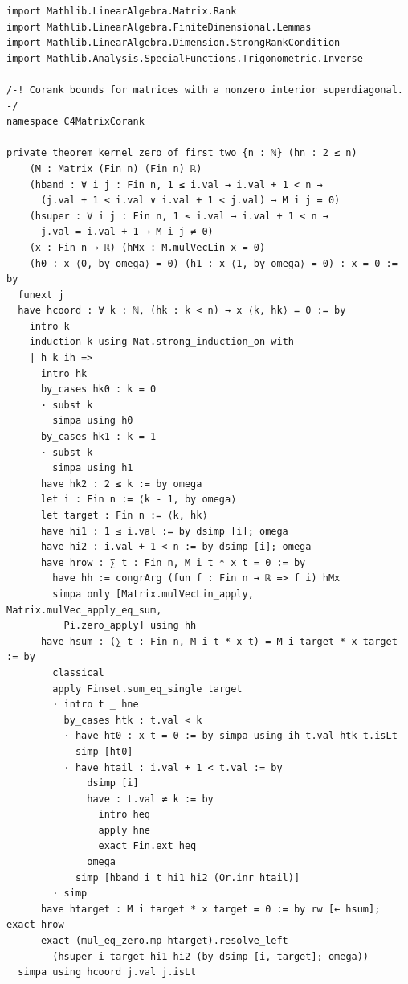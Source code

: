\documentclass[11pt,a4paper]{article}
\begin{document}
\begin{Verbatim}[breaklines,breakanywhere,fontsize=\footnotesize]
import Mathlib.LinearAlgebra.Matrix.Rank
import Mathlib.LinearAlgebra.FiniteDimensional.Lemmas
import Mathlib.LinearAlgebra.Dimension.StrongRankCondition
import Mathlib.Analysis.SpecialFunctions.Trigonometric.Inverse

/-! Corank bounds for matrices with a nonzero interior superdiagonal. -/
namespace C4MatrixCorank

private theorem kernel_zero_of_first_two {n : ℕ} (hn : 2 ≤ n)
    (M : Matrix (Fin n) (Fin n) ℝ)
    (hband : ∀ i j : Fin n, 1 ≤ i.val → i.val + 1 < n →
      (j.val + 1 < i.val ∨ i.val + 1 < j.val) → M i j = 0)
    (hsuper : ∀ i j : Fin n, 1 ≤ i.val → i.val + 1 < n →
      j.val = i.val + 1 → M i j ≠ 0)
    (x : Fin n → ℝ) (hMx : M.mulVecLin x = 0)
    (h0 : x ⟨0, by omega⟩ = 0) (h1 : x ⟨1, by omega⟩ = 0) : x = 0 := by
  funext j
  have hcoord : ∀ k : ℕ, (hk : k < n) → x ⟨k, hk⟩ = 0 := by
    intro k
    induction k using Nat.strong_induction_on with
    | h k ih =>
      intro hk
      by_cases hk0 : k = 0
      · subst k
        simpa using h0
      by_cases hk1 : k = 1
      · subst k
        simpa using h1
      have hk2 : 2 ≤ k := by omega
      let i : Fin n := ⟨k - 1, by omega⟩
      let target : Fin n := ⟨k, hk⟩
      have hi1 : 1 ≤ i.val := by dsimp [i]; omega
      have hi2 : i.val + 1 < n := by dsimp [i]; omega
      have hrow : ∑ t : Fin n, M i t * x t = 0 := by
        have hh := congrArg (fun f : Fin n → ℝ => f i) hMx
        simpa only [Matrix.mulVecLin_apply, Matrix.mulVec_apply_eq_sum,
          Pi.zero_apply] using hh
      have hsum : (∑ t : Fin n, M i t * x t) = M i target * x target := by
        classical
        apply Finset.sum_eq_single target
        · intro t _ hne
          by_cases htk : t.val < k
          · have ht0 : x t = 0 := by simpa using ih t.val htk t.isLt
            simp [ht0]
          · have htail : i.val + 1 < t.val := by
              dsimp [i]
              have : t.val ≠ k := by
                intro heq
                apply hne
                exact Fin.ext heq
              omega
            simp [hband i t hi1 hi2 (Or.inr htail)]
        · simp
      have htarget : M i target * x target = 0 := by rw [← hsum]; exact hrow
      exact (mul_eq_zero.mp htarget).resolve_left
        (hsuper i target hi1 hi2 (by dsimp [i, target]; omega))
  simpa using hcoord j.val j.isLt


\end{Verbatim}
\end{document}
